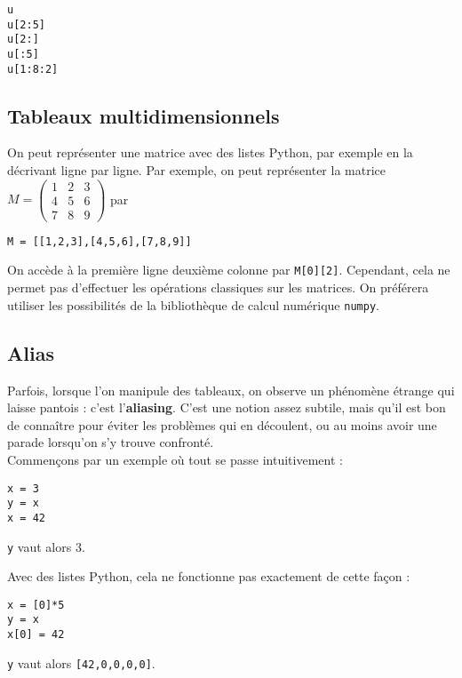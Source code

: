 \begin{lstlisting}
u
u[2:5]
u[2:]
u[:5]
u[1:8:2]
\end{lstlisting}

\subsection{Tableaux multidimensionnels}

On peut représenter une matrice avec des listes Python, par exemple en la décrivant ligne par 
ligne. 
Par exemple, on peut représenter la matrice 
$
  M=\begin{pmatrix}
    1&2&3 \\ 4&5&6 \\ 7&8&9
  \end{pmatrix}
$
par
\begin{lstlisting}
M = [[1,2,3],[4,5,6],[7,8,9]]
\end{lstlisting}
On accède à la première ligne deuxième colonne par \texttt{M[0][2]}.
Cependant, cela ne permet pas d'effectuer les opérations classiques sur les matrices. On préférera 
utiliser les possibilités de la bibliothèque de calcul numérique \texttt{numpy}.

\subsection{Alias}

Parfois, lorsque l'on manipule des tableaux, on observe un phénomène étrange qui laisse pantois : 
c'est l'\textbf{aliasing}. C'est une notion assez subtile, mais qu'il est bon de connaître pour 
éviter les problèmes qui en découlent, ou au moins avoir une parade lorsqu'on s'y trouve 
confronté.\\


Commençons par un exemple où tout se passe intuitivement :
\begin{lstlisting}
x = 3
y = x
x = 42
\end{lstlisting}

\texttt{y} vaut alors 3. 

Avec des listes Python, cela ne fonctionne pas exactement de cette façon : 
\begin{lstlisting}
x = [0]*5
y = x
x[0] = 42
\end{lstlisting}
\texttt{y} vaut alors \texttt{[42,0,0,0,0]}.

